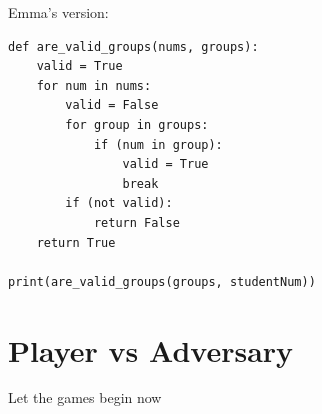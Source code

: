\documentclass[twocolumn, 10pt]{article}
\begin{document}
Emma's version:

\footnotesize
\begin{verbatim}
def are_valid_groups(nums, groups):
    valid = True
    for num in nums:
        valid = False
        for group in groups:
            if (num in group): 
                valid = True
                break
        if (not valid):
            return False
    return True

print(are_valid_groups(groups, studentNum))
\end{verbatim}
\normalsize

\section{Player vs Adversary}
Let the games begin now
\end{document}
